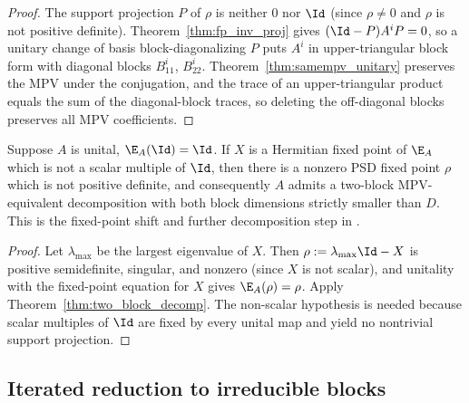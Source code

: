 \begin{proof}
    \leanok
    The support projection $P$ of $\rho$ is neither $0$ nor $\Id$ (since
    $\rho \neq 0$ and $\rho$ is not positive definite).
    Theorem~\ref{thm:fp_inv_proj} gives $(\Id - P) A^i P = 0$, so a unitary
    change of basis block-diagonalizing $P$ puts $A^i$ in upper-triangular block
    form with diagonal blocks $B_{11}^i$, $B_{22}^i$.
    Theorem~\ref{thm:samempv_unitary} preserves the MPV under the conjugation,
    and the trace of an upper-triangular product equals the sum of the
    diagonal-block traces, so deleting the off-diagonal blocks preserves all MPV
    coefficients.
\end{proof}

\begin{theorem}%
    \label{thm:unital_nonscalar_fixed_point_split}
    \leanok
    Suppose $A$ is unital, $\E_A(\Id)=\Id$. If $X$ is a Hermitian fixed point of
    $\E_A$ which is not a scalar multiple of $\Id$, then there is a nonzero PSD
    fixed point $\rho$ which is not positive definite, and consequently $A$
    admits a two-block MPV-equivalent decomposition with both block dimensions
    strictly smaller than $D$. This is the fixed-point shift and further
    decomposition step in
    \cite[Theorem~4]{PerezGarcia2007Matrix}.
\end{theorem}

\begin{proof}\leanok
    Let $\lambda_{\max}$ be the largest eigenvalue of $X$. Then
    $\rho := \lambda_{\max}\Id - X$ is positive semidefinite, singular, and
    nonzero (since $X$ is not scalar), and unitality with the fixed-point
    equation for $X$ gives $\E_A(\rho)=\rho$. Apply
    Theorem~\ref{thm:two_block_decomp}. The non-scalar hypothesis is needed
    because scalar multiples of $\Id$ are fixed by every unital map and yield no
    nontrivial support projection.
\end{proof}

\subsection{Iterated reduction to irreducible blocks}

